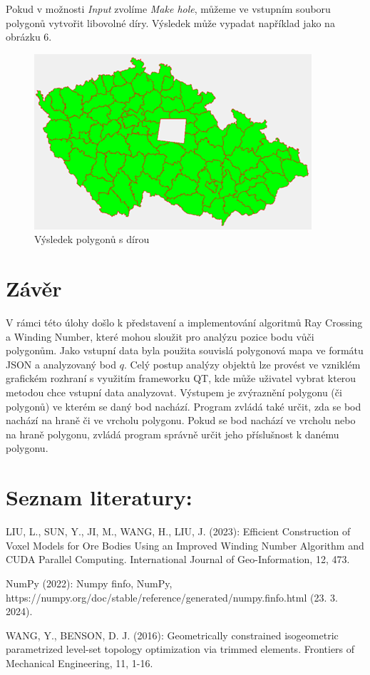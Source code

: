 \documentclass{article}
\begin{document}
\begin{spacing}{1.5}
Pokud v možnosti \textit{Input} zvolíme \textit{Make hole}, můžeme ve vstupním souboru polygonů vytvořit libovolné díry. Výsledek může vypadat například jako na obrázku 6.

\begin{figure}[h]
    \centering
    \includegraphics[width=0.6\linewidth]{images/app04.png}
    \caption{Výsledek polygonů s dírou}
    \label{fig:enter-label}
\end{figure}

\section{Závěr}
V rámci této úlohy došlo k představení a implementování algoritmů Ray Crossing a Winding Number, které mohou sloužit pro analýzu pozice bodu vůči polygonům. Jako vstupní data byla použita souvislá polygonová mapa ve formátu JSON a analyzovaný bod $q$. Celý postup analýzy objektů lze provést ve vzniklém grafickém rozhraní s využitím frameworku QT, kde může uživatel vybrat kterou metodou chce vstupní data analyzovat. Výstupem je zvýraznění polygonu (či polygonů) ve kterém se daný bod nachází. Program zvládá také určit, zda se bod nachází na hraně či ve vrcholu polygonu. Pokud se bod nachází ve vrcholu nebo na hraně polygonu, zvládá program správně určit jeho příslušnost k danému polygonu.


\newpage
\section*{Seznam literatury: }
LIU, L., SUN, Y., JI, M., WANG, H., LIU, J. (2023): Efficient Construction of Voxel Models for Ore Bodies Using an Improved Winding Number Algorithm and CUDA Parallel Computing. International Journal of Geo-Information, 12, 473.

\vspace*{0.5cm}
\noindent NumPy (2022): Numpy finfo, NumPy, https://numpy.org/doc/stable/reference/generated/numpy.finfo.html
(23. 3. 2024).

\vspace*{0.5cm}
\noindent WANG, Y., BENSON, D. J. (2016): Geometrically constrained isogeometric parametrized level-set topology optimization via trimmed elements. Frontiers of Mechanical Engineering, 11, 1-16. 

\end{spacing}
\end{document}
